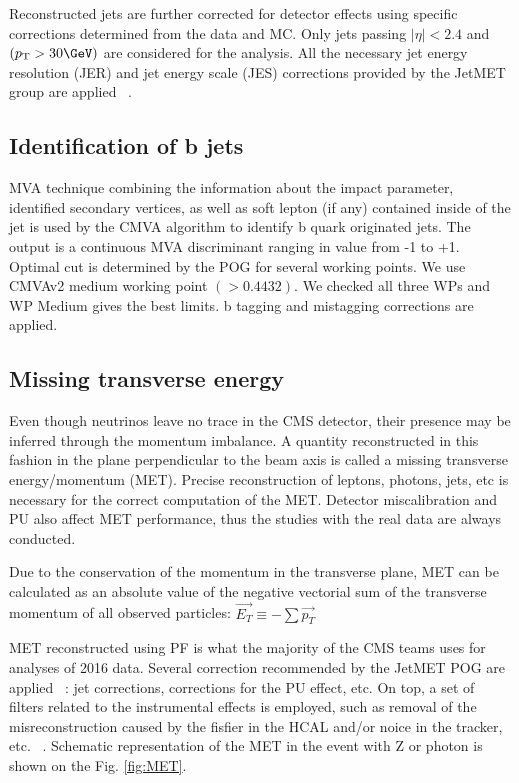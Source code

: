     Reconstructed jets are further corrected for detector effects using specific corrections determined from the data and MC. Only jets passing $|\eta|<2.4$ and  $(\pt > 30\GeV)$ are considered for the analysis. 
    All the necessary jet energy resolution (JER) and jet energy scale (JES) corrections provided by the JetMET group are applied ~\cite{JetMETgroup}.


\subsection{Identification of b jets\label{sec:bjets}}
MVA technique combining the information about the impact parameter, identified secondary vertices, as well as soft lepton (if any) contained inside of the jet is used by the CMVA algorithm to identify b quark originated jets. The output is a continuous MVA discriminant ranging in value from -1 to +1. Optimal cut is determined by the POG for several working points. We use CMVAv2 medium working point  $(>0.4432)$. We checked all three WPs and WP Medium gives the best limits. b tagging and mistagging corrections are applied.



\subsection{Missing transverse energy}\label{sec:MET}
Even though neutrinos leave no trace in the CMS detector, their presence may be inferred through the momentum imbalance. A quantity reconstructed in this fashion in the plane perpendicular to the beam axis is called a missing transverse energy/momentum (MET). Precise reconstruction of leptons, photons, jets, etc is necessary for the correct computation of the MET. Detector miscalibration and PU also affect MET performance, thus the studies with the real data are always conducted.   

Due to the conservation of the momentum in the transverse plane, MET can be calculated as an absolute value of the negative vectorial sum of the transverse momentum of all observed particles:  
$\overrightarrow{E_T} \equiv -\sum \overrightarrow{p_T}$

MET reconstructed using PF is what the majority of the CMS teams uses for analyses of 2016 data.  
Several correction recommended by the JetMET POG are applied ~\cite{MissingETRun2Corrections}: jet corrections, corrections for the PU effect, etc. On top, a set of filters related to the instrumental effects is employed, such as removal of the misreconstruction caused by the fisfier in the HCAL and/or noice in the tracker, etc.  ~\cite{MissingETOptionalFiltersRun2}. Schematic representation of the MET in the event with Z or photon is shown on the Fig. \ref{fig:MET}.

